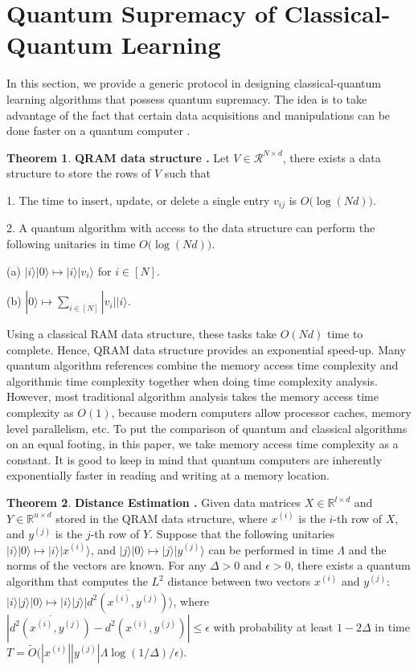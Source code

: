 \documentclass[11pt]{article}
\theoremstyle{definition}
\newtheorem{theorem}{Theorem}[section]
\def\xsi{x^{(i)}}
\def\ysj{y^{(j)}}
\begin{document}
\section{Quantum Supremacy of Classical-Quantum Learning}
\label{supremacy}

In this section, we provide a generic protocol in designing classical-quantum learning algorithms that possess quantum supremacy. The idea is to take advantage of the fact that certain data acquisitions and manipulations can be done faster on a quantum computer \cite{QRAM, lloyd2013quantum, kerenidis2018q, hhl}.

\begin{theorem}
\textbf{QRAM data structure \cite{QRAM}.} 
Let $V \in \mathcal{R}^{N \times d}$, there exists a data structure to store the rows of $V$ such that

1. The time to insert, update, or delete a single entry $v_{ij}$ is 
$O\big(\log (N d) \big)$.

2. A quantum algorithm with access to the data structure can perform the following unitaries in time $O\big(\log (N d) \big)$.

(a) $|i\rangle |0\rangle \mapsto |i\rangle |v_i\rangle$ for $i \in [N]$.

(b) $|0\rangle \mapsto \sum_{i \in [N]} |v_i| |i\rangle$.
\end{theorem}

Using a classical RAM data structure, these tasks take $O(N d)$ time to complete. Hence, QRAM data structure provides an exponential speed-up. Many quantum algorithm references combine the memory access time complexity and algorithmic time complexity together when doing time complexity analysis. However, most traditional algorithm analysis takes the memory access time complexity as $O(1)$, because modern computers allow processor caches, memory level parallelism, etc. To put the comparison of quantum and classical algorithms on an equal footing, in this paper, we take memory access time complexity as a constant. It is good to keep in mind that quantum computers are inherently exponentially faster in reading and writing at a memory location.


\begin{theorem}
\textbf{Distance Estimation \cite{lloyd2013quantum, kerenidis2018q}.} 
Given data matrices $X \in \mathbb{R}^{l \times d}$ and $Y \in \mathbb{R}^{u \times d}$ stored in the QRAM data structure, where $\xsi$ is the $i$-th row of $X$, and $\ysj$ is the $j$-th row of $Y$. Suppose that the following unitaries $|i\rangle |0\rangle \mapsto |i\rangle |\xsi\rangle$, and $|j\rangle |0\rangle \mapsto |j\rangle |\ysj\rangle$ can be performed in time $\Lambda$ and the norms of the vectors are known. For any $\Delta > 0$ and $\epsilon > 0$, there exists a quantum algorithm that computes the $L^2$ distance between two vectors $\xsi$ and $\ysj$:
$|i\rangle |j\rangle |0\rangle \mapsto |i\rangle |j\rangle |\overline{d^2(\xsi, \ysj)} \rangle$, where $|\overline{d^2(\xsi, \ysj)} - d^2(\xsi, \ysj)| \leq \epsilon$ with probability at least $1 - 2 \Delta$ in time $T = \tilde{O}\Big(|\xsi||\ysj| \Lambda \log(1/\Delta) / \epsilon \Big)$.
\end{theorem}
\end{document}
